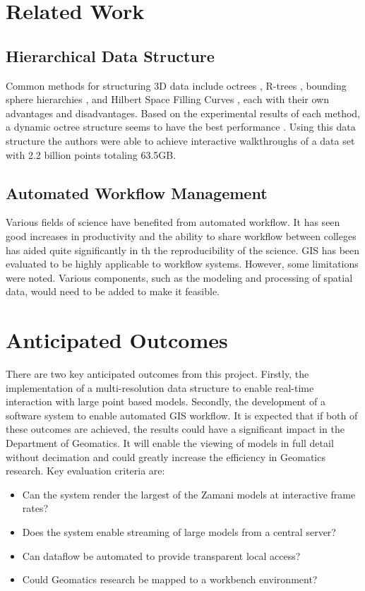 \documentclass[12pt,a4paper]{article}
\begin{document}
\section{Related Work}
\subsection{Hierarchical Data Structure}
Common methods for structuring 3D data include octrees \cite{interactivepointclouds},
R-trees \cite{rtree}, bounding sphere hierarchies \cite{qsplat}, and Hilbert Space
Filling Curves \cite{hilbert}, each with their own advantages and disadvantages. Based
on the experimental results of each method, a dynamic octree structure seems to have
the best performance \cite{interactivepointclouds}. Using this data structure the
authors were able to achieve interactive walkthroughs of a data set with 2.2
billion points totaling 63.5GB.

\subsection{Automated Workflow Management}
Various fields of science have benefited from automated workflow. It has
seen good increases in productivity \cite{Brahe:2007:SWW:1316624.1316661} and the ability to share
workflow between colleges has aided quite significantly in th the reproducibility
of the science\cite{4721191}. GIS has been evaluated to be highly applicable to
workflow systems\cite{migliorini2011workflow}. However, some limitations were noted. Various components, such as the modeling and processing of spatial data,
would need to be added to make it feasible.

\section{Anticipated Outcomes}
There are two key anticipated outcomes from this project. Firstly, the implementation of a multi-resolution data structure to enable real-time interaction with large point based models. Secondly, the development of a software system to enable automated GIS workflow. It is expected that if both of these outcomes are achieved, the results could have a significant impact in the Department of Geomatics. It will enable the viewing of models in full detail without decimation and could greatly increase the efficiency in Geomatics research. Key evaluation criteria are:
\begin{itemize}
\item Can the system render the largest of the Zamani models at interactive frame rates?
\item Does the system enable streaming of large models from a central server?
\item Can dataflow be automated to provide transparent local access?
\item Could Geomatics research be mapped to a workbench environment?
\end{itemize}
\end{document}
